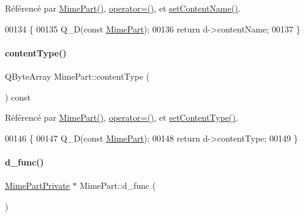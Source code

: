 Référencé par \hyperlink{class_simple_mail_1_1_mime_part_a22b25ea7c1bb06d1b73f4c43103bfa1e}{Mime\+Part()}, \hyperlink{class_simple_mail_1_1_mime_part_a34320574f8cba9dbe03cca99e3fca942}{operator=()}, et \hyperlink{class_simple_mail_1_1_mime_part_a83f6e6e295967d11923b64ed0bda437f}{set\+Content\+Name()}.


\begin{DoxyCode}
00134 \{
00135     Q\_D(\textcolor{keyword}{const} \hyperlink{class_simple_mail_1_1_mime_part}{MimePart});
00136     \textcolor{keywordflow}{return} d->contentName;
00137 \}
\end{DoxyCode}
\mbox{\label{class_simple_mail_1_1_mime_part_a3952c9506cc3baf478ecf3a8c204297a}} 
\paragraph{\texorpdfstring{content\+Type()}{contentType()}}
{\footnotesize\ttfamily Q\+Byte\+Array Mime\+Part\+::content\+Type (\begin{DoxyParamCaption}{ }\end{DoxyParamCaption}) const}



Référencé par \hyperlink{class_simple_mail_1_1_mime_part_a22b25ea7c1bb06d1b73f4c43103bfa1e}{Mime\+Part()}, \hyperlink{class_simple_mail_1_1_mime_part_a34320574f8cba9dbe03cca99e3fca942}{operator=()}, et \hyperlink{class_simple_mail_1_1_mime_part_a5acb0f9b764b723c4cfb1058490d2d8d}{set\+Content\+Type()}.


\begin{DoxyCode}
00146 \{
00147     Q\_D(\textcolor{keyword}{const} \hyperlink{class_simple_mail_1_1_mime_part}{MimePart});
00148     \textcolor{keywordflow}{return} d->contentType;
00149 \}
\end{DoxyCode}
\mbox{\label{class_simple_mail_1_1_mime_part_aae9030aebac36f316718eeea6afc5971}} 
\paragraph{\texorpdfstring{d\+\_\+func()}{d\_func()}\hspace{0.1cm}{\footnotesize\ttfamily [1/2]}}
{\footnotesize\ttfamily \hyperlink{class_simple_mail_1_1_mime_part_private}{Mime\+Part\+Private} $\ast$ Mime\+Part\+::d\+\_\+func (\begin{DoxyParamCaption}{ }\end{DoxyParamCaption})\hspace{0.3cm}{\ttfamily [protected]}}



